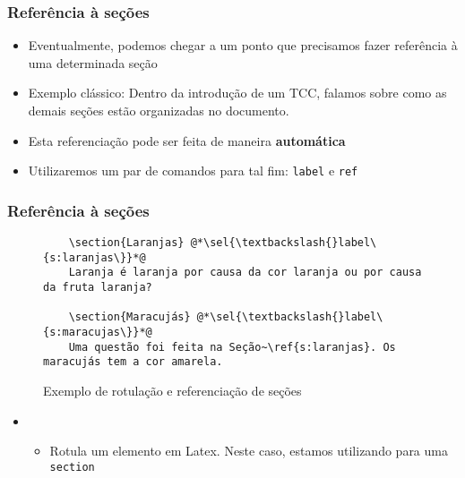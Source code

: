 \begin{frame}[fragile] \frametitle{Referência à seções}
\begin{itemize}
	\item Eventualmente, podemos chegar a um ponto que precisamos fazer referência à uma determinada seção
	\item Exemplo clássico: Dentro da introdução de um TCC, falamos sobre como as demais seções estão organizadas no documento.
	\item Esta referenciação pode ser feita de maneira \textbf{automática}
	\item Utilizaremos um par de comandos para tal fim: \texttt{label} e \texttt{ref}
\end{itemize}
\end{frame}

\begin{frame}[fragile] \frametitle{Referência à seções}
\begin{figure}[!t]
\caption{Exemplo de rotulação e referenciação de seções}
\begin{lstlisting}
	\section{Laranjas} @*\sel{\textbackslash{}label\{s:laranjas\}}*@
	Laranja é laranja por causa da cor laranja ou por causa da fruta laranja?

	\section{Maracujás} @*\sel{\textbackslash{}label\{s:maracujas\}}*@
	Uma questão foi feita na Seção~\ref{s:laranjas}. Os maracujás tem a cor amarela.

\end{lstlisting}
\ownsrc
\end{figure}

\begin{itemize}
	\item {}
	\begin{itemize}
		\item Rotula um elemento em Latex. Neste caso, estamos utilizando para uma \texttt{section}
	\end{itemize}
\end{itemize}
\end{frame}

